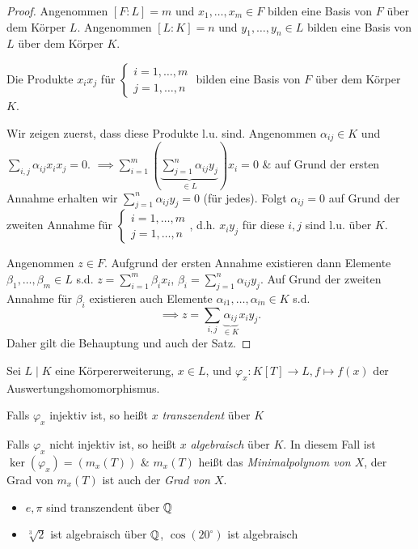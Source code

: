 \begin{proof}
	Angenommen $[F:L] = m$ und $x_1,\ldots, x_{m} \in F$ bilden  eine Basis von $F$ über dem Körper $L$.
	Angenommen $[L:K] = n$ und $y_1,\ldots,y_{n} \in L$ bilden eine Basis von $L$ über dem Körper $K$.
	\begin{claim}
		Die Produkte $x_i x_{j}$ für $\begin{cases}
			i = 1,\ldots,m\\
			j = 1,\ldots,n
		\end{cases}$
		bilden eine Basis von $F$ über dem Körper $K$.
	\end{claim}
	Wir zeigen zuerst, dass diese Produkte l.u. sind. Angenommen $\alpha_{ij} \in K$ und $\sum_{i,j} \alpha_{ij} x_{i} x_{j} = 0$.
	$\implies \sum_{i=1}^{m} \left( \underbrace{\sum_{j=1}^{n} \alpha_{ij} y_{j}}_{\in L} \right) x_{i} = 0$ \& auf Grund der ersten Annahme erhalten wir
	$\sum_{j=1}^{n} \alpha_{ij} y_{j} = 0$ (für jedes).
	Folgt $\alpha_{ij} = 0$ auf Grund der zweiten Annahme für $\begin{cases}
		i=1,\ldots,m\\
		j=1,\ldots,n
	\end{cases}$, d.h. $x_{i} y_{j}$ für diese $i,j$ sind l.u. über $K$.

	Angenommen $z \in F$. Aufgrund der ersten Annahme existieren dann Elemente $\beta_1,\ldots,\beta_{m} \in L$ s.d.
	$z = \sum_{i=1}^{m} \beta_{i} x_{i}$, $\beta_{i} = \sum_{j=1}^{n} \alpha_{i j} y_{j}$. Auf Grund der zweiten Annahme für $\beta_{i}$ existieren auch Elemente $\alpha_{i 1},\ldots, \alpha_{i n} \in K$ s.d.
	\[
	\implies z = \sum_{i,j} \underbrace{\alpha_{i j}}_{\in K} x_{i} y_{j}
	.\]
	Daher gilt die Behauptung und auch der Satz.
\end{proof}

\begin{definition}
	Sei $L \mid K$ eine Körpererweiterung, $x \in L$, und $\varphi_{x}: K[T] \to L, f \mapsto f(x)$ der Auswertungshomomorphismus.

	Falls $\varphi_{x}$ injektiv ist, so heißt $x$ \emph{transzendent} über $K$ 

	Falls $\varphi_{x}$ nicht injektiv ist, so heißt $x$ \emph{algebraisch} über $K$.
	In diesem Fall ist $\ker(\varphi_{x}) = (m_{x}(T))$ \& $m_{x}(T)$ heißt das
	\emph{Minimalpolynom von $X$}, der Grad von $m_{x}(T)$ ist auch der \emph{Grad von $X$}.
\end{definition}

\begin{eg}
	\begin{itemize}
		\item $e,\pi$ sind transzendent über $\mathbb{Q}$ 
		\item $\sqrt[3]{2}$ ist algebraisch über $\mathbb{Q}$, $\cos(20^{\circ})$ ist algebraisch 
	\end{itemize}
\end{eg}

